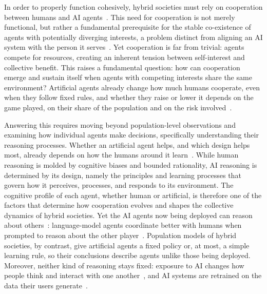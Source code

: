 In order to properly function cohesively, hybrid societies must rely on cooperation between humans and AI agents~\cite{dafoeCooperativeAIMachines2021}. This need for cooperation is not merely functional, but rather a fundamental prerequisite for the stable co-existence of agents with potentially diverging interests, a problem distinct from aligning an AI system with the person it serves~\cite{dafoeOpenProblemsCooperative2020}. Yet cooperation is far from trivial: agents compete for resources, creating an inherent tension between self-interest and collective benefit. This raises a fundamental question: how can cooperation emerge and sustain itself when agents with competing interests share the same environment? Artificial agents already change how much humans cooperate, even when they follow fixed rules, and whether they raise or lower it depends on the game played, on their share of the population and on the risk involved~\cite{guoFacilitatingCooperationHumanagent2023, fuOptimalIntegrationIntelligent2026, terruchaArtCompensationHow2024}.

Answering this requires moving beyond population-level observations and examining how individual agents make decisions, specifically understanding their reasoning processes. Whether an artificial agent helps, and which design helps most, already depends on how the humans around it learn~\cite{sharmaSmallBotsBig2023, zimmaroEmergenceCooperationOneshot2024}. While human reasoning is molded by cognitive biases and bounded rationality, AI reasoning is determined by its design, namely the principles and learning processes that govern how it perceives, processes, and responds to its environment. The cognitive profile of each agent, whether human or artificial, is therefore one of the factors that determine how cooperation evolves and shapes the collective dynamics of hybrid societies. Yet the AI agents now being deployed can reason about others~\cite{oecdIntroducingOECDAI2025}: language-model agents coordinate better with humans when prompted to reason about the other player~\cite{akataPlayingRepeatedGames2025}. Population models of hybrid societies, by contrast, give artificial agents a fixed policy or, at most, a simple learning rule, so their conclusions describe agents unlike those being deployed. Moreover, neither kind of reasoning stays fixed: exposure to AI changes how people think and interact with one another~\cite{riedlCognitiveSpilloverHuman2026}, and AI systems are retrained on the data their users generate~\cite{pedreschiHumanAICoevolution2025}.

